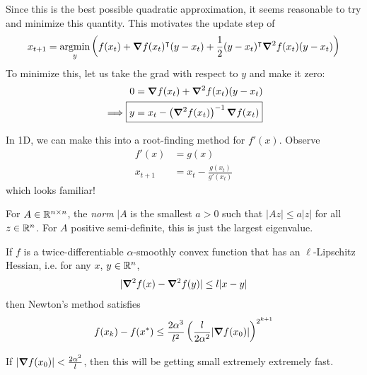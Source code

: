 \documentclass{../template/note}
\begin{document}
    Since this is the best possible quadratic approximation, it seems reasonable to try and minimize this quantity. This motivates the update step of
    \begin{align*}
        x_{t+1} = \argmin_y \left(f(x_t) + \grad f(x_t)^\intercal (y-x_t) + \frac 1 2 (y-x_t)^\intercal \grad^2 f(x_t) (y-x_t)\right)
    \end{align*}
    To minimize this, let us take the grad with respect to $y$ and make it zero:
    \begin{align*}
        0 &= \grad f(x_t) + \grad^2 f(x_t) (y-x_t) \\
        \implies \Aboxed{y &= x_t - \left(\grad^2 f(x_t)\right)^{-1} \grad f(x_t)}
    \end{align*}
    
    In 1D, we can make this into a root-finding method for $f'(x)$. Observe
    \begin{align*}
        f'(x) &= g(x) \\
        x_{t+1} &= x_t - \frac{g(x_t)}{g'(x_t)}
    \end{align*}
    which looks familiar!

    \begin{definition}
        For $A \in \mathbb R^{n \times n}$, the \emph{norm} $|A$ is the smallest $a > 0$ such that $|Az| \leq a|z|$ for all $z \in \mathbb R^n$. For $A$ positive semi-definite, this is just the largest eigenvalue.
    \end{definition}
    
    \begin{theorem}
        If $f$ is a twice-differentiable $\alpha$-smoothly convex function that has an $\ell$-Lipschitz Hessian, i.e. for any $x$, $y \in \mathbb R^n$,
        \begin{align*}
            |\grad^2 f(x) - \grad^2 f(y)| \leq l|x-y|
        \end{align*}
        then Newton's method satisfies
        \begin{align*}
            f(x_k) - f(x^*) \leq \frac{2\alpha^3}{l^2} \left(\frac{l}{2\alpha^2}|\grad f(x_0)|\right)^{2^{k+1}}
        \end{align*}
    \end{theorem}
    
    \begin{remark*}
        If $|\grad f(x_0)| < \frac{2\alpha^2}{l}$, then this will be getting small extremely extremely fast.
    \end{remark*}
    
\end{document}
